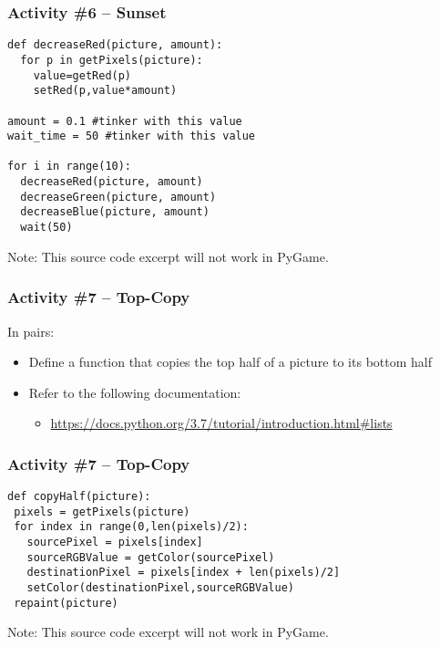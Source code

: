 \begin{frame}[fragile]
	\frametitle{Activity \#6 -- Sunset}

\begin{lstlisting}
def decreaseRed(picture, amount):
  for p in getPixels(picture):
    value=getRed(p)
    setRed(p,value*amount)

amount = 0.1 #tinker with this value
wait_time = 50 #tinker with this value    
    
for i in range(10):
  decreaseRed(picture, amount)
  decreaseGreen(picture, amount)
  decreaseBlue(picture, amount)
  wait(50)
\end{lstlisting}

Note: This source code excerpt will not work in PyGame.

\end{frame}

\begin{frame}
	\frametitle{Activity \#7 -- Top-Copy}
	
	In pairs:
	
	\vspace{2em}
	
	\begin{itemize}
		\item Define a function that copies the top half of a picture to its bottom half
		\item Refer to the following documentation:
		\begin{itemize}
			\item \url{https://docs.python.org/3.7/tutorial/introduction.html\#lists}
		\end{itemize}
	\end{itemize}
\end{frame}

\begin{frame}[fragile]
	\frametitle{Activity \#7 -- Top-Copy}

\begin{lstlisting}
def copyHalf(picture):
 pixels = getPixels(picture)
 for index in range(0,len(pixels)/2):
   sourcePixel = pixels[index]
   sourceRGBValue = getColor(sourcePixel)
   destinationPixel = pixels[index + len(pixels)/2]
   setColor(destinationPixel,sourceRGBValue)
 repaint(picture)
\end{lstlisting}

Note: This source code excerpt will not work in PyGame.

\end{frame}


